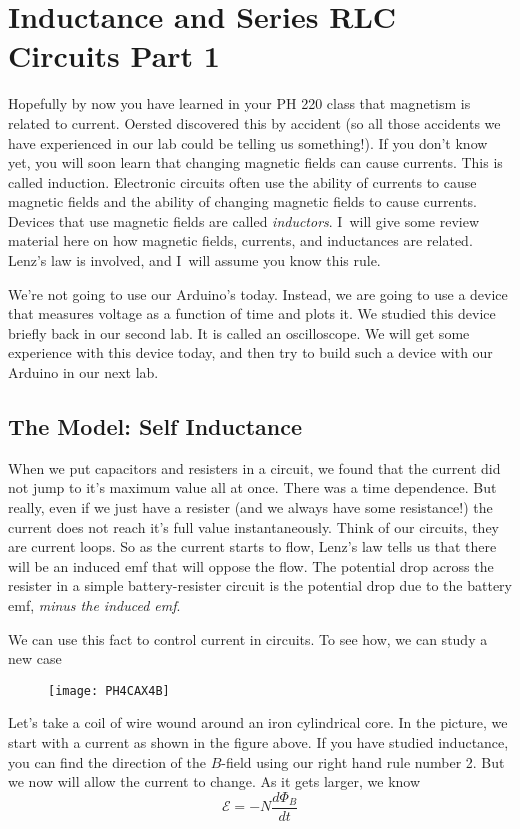 \chapter{Inductance and Series RLC Circuits Part 1}
Hopefully by now you have learned in your PH 220 class that magnetism is
related to current. Oersted discovered this by accident (so all those
accidents we have experienced in our lab could be telling us something!). If
you don't know yet, you will soon learn that changing magnetic fields can
cause currents. This is called induction. Electronic circuits often use the
ability of currents to cause magnetic fields and the ability of changing
magnetic fields to cause currents. Devices that use magnetic fields are
called \emph{inductors}. I\ will give some review material here on how
magnetic fields, currents, and inductances are related. Lenz's law is
involved, and I\ will assume you know this rule.

We're not going to use our Arduino's today. Instead, we are going to use a
device that measures voltage as a function of time and plots it. We studied
this device briefly back in our second lab. It is called an oscilloscope. We
will get some experience with this device today, and then try to build such
a device with our Arduino in our next lab.

\section{The Model: Self Inductance}

When we put capacitors and resisters in a circuit, we found that the current
did not jump to it's maximum value all at once. There was a time dependence.
But really, even if we just have a resister (and we always have some
resistance!) the current does not reach it's full value instantaneously.
Think of our circuits, they are current loops. So as the current starts to
flow, Lenz's law tells us that there will be an induced emf that will oppose
the flow. The potential drop across the resister in a simple
battery-resister circuit is the potential drop due to the battery emf, \emph{%
minus the induced emf}.

We can use this fact to control current in circuits. To see how, we can
study a new case\begin{figure}[h!]
\texttt{[image: PH4CAX4B]}
\end{figure}Let's take a coil of wire wound
around an iron cylindrical core. In the picture, we start with a current as
shown in the figure above. If you have studied inductance, you can find the
direction of the $B$-field using our right hand rule number 2. But we now
will allow the current to change. As it gets larger, we know 
\begin{equation*}
\mathcal{E}=-N\frac{d\Phi _{B}}{dt}
\end{equation*}


